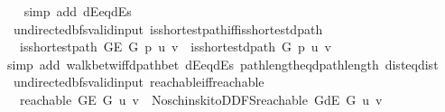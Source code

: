 \begin{isabellebody}
\ \ \isamarkupfalse%
\ {\isacharparenleft}{\kern0pt}simp\ add{\isacharcolon}{\kern0pt}\ dE{\isacharunderscore}{\kern0pt}eq{\isacharunderscore}{\kern0pt}dEs{\isacharparenright}{\kern0pt}%
\endisatagproof
{\isafoldproof}%
%
\isadelimproof
\isanewline
%
\endisadelimproof
\isanewline
{}\isamarkupfalse%
\ {\isacharparenleft}{\kern0pt}\ undirected{\isacharunderscore}{\kern0pt}bfs{\isacharunderscore}{\kern0pt}valid{\isacharunderscore}{\kern0pt}input{\isacharparenright}{\kern0pt}\ is{\isacharunderscore}{\kern0pt}shortest{\isacharunderscore}{\kern0pt}path{\isacharunderscore}{\kern0pt}iff{\isacharunderscore}{\kern0pt}is{\isacharunderscore}{\kern0pt}shortest{\isacharunderscore}{\kern0pt}dpath{\isacharcolon}{\kern0pt}\isanewline
\ \ \ {\isachardoublequoteopen}is{\isacharunderscore}{\kern0pt}shortest{\isacharunderscore}{\kern0pt}path\ {\isacharparenleft}{\kern0pt}G{\isachardot}{\kern0pt}E\ G{\isacharparenright}{\kern0pt}\ p\ u\ v\ {\isasymlongleftrightarrow}\ is{\isacharunderscore}{\kern0pt}shortest{\isacharunderscore}{\kern0pt}dpath\ G\ p\ u\ v{\isachardoublequoteclose}\isanewline
%
\isadelimproof
\ \ %
\endisadelimproof
%
\isatagproof
{}\isamarkupfalse%
\ {\isacharparenleft}{\kern0pt}simp\ add{\isacharcolon}{\kern0pt}\ walk{\isacharunderscore}{\kern0pt}betw{\isacharunderscore}{\kern0pt}iff{\isacharunderscore}{\kern0pt}dpath{\isacharunderscore}{\kern0pt}bet\ dE{\isacharunderscore}{\kern0pt}eq{\isacharunderscore}{\kern0pt}dEs\ path{\isacharunderscore}{\kern0pt}length{\isacharunderscore}{\kern0pt}eq{\isacharunderscore}{\kern0pt}dpath{\isacharunderscore}{\kern0pt}length\ dist{\isacharunderscore}{\kern0pt}eq{\isacharunderscore}{\kern0pt}dist{\isacharparenright}{\kern0pt}%
\endisatagproof
{\isafoldproof}%
%
\isadelimproof
\isanewline
%
\endisadelimproof
\isanewline
{}\isamarkupfalse%
\ {\isacharparenleft}{\kern0pt}\ undirected{\isacharunderscore}{\kern0pt}bfs{\isacharunderscore}{\kern0pt}valid{\isacharunderscore}{\kern0pt}input{\isacharparenright}{\kern0pt}\ reachable{\isacharunderscore}{\kern0pt}iff{\isacharunderscore}{\kern0pt}reachable{\isacharcolon}{\kern0pt}\isanewline
\ \ \ {\isachardoublequoteopen}reachable\ {\isacharparenleft}{\kern0pt}G{\isachardot}{\kern0pt}E\ G{\isacharparenright}{\kern0pt}\ u\ v\ {\isasymlongleftrightarrow}\ Noschinski{\isacharunderscore}{\kern0pt}to{\isacharunderscore}{\kern0pt}DDFS{\isachardot}{\kern0pt}reachable\ {\isacharparenleft}{\kern0pt}G{\isachardot}{\kern0pt}dE\ G{\isacharparenright}{\kern0pt}\ u\ v{\isachardoublequoteclose}\isanewline

\end{isabellebody}
